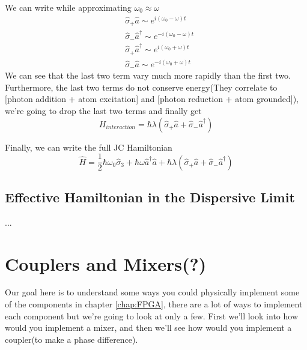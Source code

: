 \documentclass[english, a4paper, 12pt, twoside]{article}
\numberwithin{equation}{section} %
\begin{document}
We can write while approximating $\omega_0 \approx \omega$
\begin{equation}
    \begin{split}
        &\hat{\sigma}_+\hat{a} \sim e^{i(\omega_0 - \omega)t}\\
        &\hat{\sigma}_-\hat{a}^\dag \sim e^{-i(\omega_0 - \omega)t}\\
        &\hat{\sigma}_+\hat{a}^\dag \sim e^{i(\omega_0 + \omega)t}\\
        &\hat{\sigma}_-\hat{a} \sim e^{-i(\omega_0 + \omega)t}
    \end{split}
\end{equation}
We can see that the last two term vary much more rapidly than the first two. Furthermore, the last two terms do not conserve energy(They correlate to [photon addition + atom excitation] and [photon reduction + atom grounded]), we're going to drop the last two terms and finally get
\begin{equation}
    \boxed{H_{interaction} = \hbar\lambda(\hat{\sigma}_+\hat{a} + \hat{\sigma}_-\hat{a}^\dag)}
\end{equation}

\par

Finally, we can write the full JC Hamiltonian
\begin{equation}
    \boxed{\hat{H} = \frac{1}{2}\hbar \omega_0\hat{\sigma}_3 
                     + \hbar \omega \hat{a}^\dag \hat{a} 
                     +  \hbar\lambda(\hat{\sigma}_+\hat{a} + \hat{\sigma}_-\hat{a}^\dag)}
\end{equation}
\subsection{Effective Hamiltonian in the Dispersive Limit}
...

\newpage
\section{Couplers and Mixers(?)} \label{appen:Mixers} %
Our goal here is to understand some ways you could physically implement some of the components in chapter \ref{chap:FPGA}, there are a lot of ways to implement each component but we're going to look at only a few. First we'll look into how would you implement a mixer, and then we'll see how would you implement a coupler(to make a phase difference).
\end{document}
